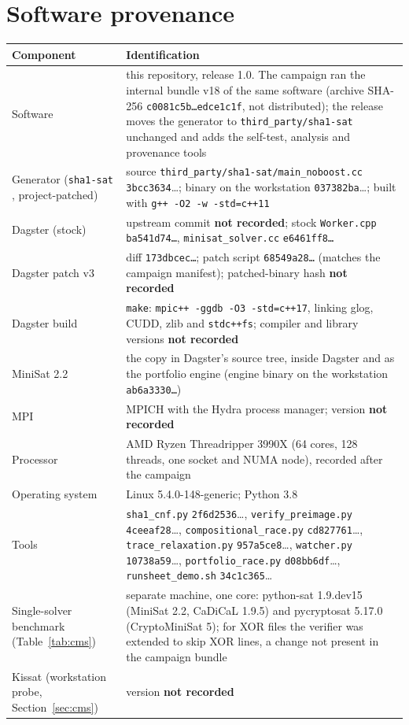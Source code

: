 \documentclass[11pt,a4paper]{article}
\begin{document}
\section{Software provenance}\label{app:prov}
\begin{center}\footnotesize
\begin{tabularx}{\textwidth}{@{}lL@{}}
\toprule
\textbf{Component} & \textbf{Identification}\\
\midrule
Software & this repository, release 1.0. The campaign ran the internal bundle v18 of the same
software (archive SHA-256 \texttt{c0081c5b\dots edce1c1f}, not distributed); the release moves the
generator to \texttt{third\_party/sha1-sat} unchanged and adds the self-test, analysis and provenance
tools\\
Generator (\texttt{sha1-sat} \cite{nossum}, project-patched) & source \texttt{third\_party/sha1-sat/main\_noboost.cc} \texttt{3bcc3634}\dots;
binary on the workstation \texttt{037382ba}\dots; built with \texttt{g++ -O2 -w -std=c++11}\\
Dagster (stock) & upstream commit \textbf{not recorded}; stock \texttt{Worker.cpp} \texttt{ba541d74\dots},
\texttt{minisat\_solver.cc} \texttt{e6461ff8\dots}\\
Dagster patch v3 & diff \texttt{173dbcec\dots}; patch script \texttt{68549a28\dots} (matches the campaign
manifest); patched-binary hash \textbf{not recorded}\\
Dagster build & \texttt{make}: \texttt{mpic++ -ggdb -O3 -std=c++17}, linking glog, CUDD, zlib and
\texttt{stdc++fs}; compiler and library versions \textbf{not recorded}\\
MiniSat 2.2 & the copy in Dagster's source tree, inside Dagster and as the portfolio engine
(engine binary on the workstation \texttt{ab6a3330\dots})\\
MPI & MPICH with the Hydra process manager; version \textbf{not recorded}\\
Processor & AMD Ryzen Threadripper 3990X (64 cores, 128 threads, one socket and NUMA node), recorded after the campaign\\
Operating system & Linux 5.4.0-148-generic; Python 3.8\\
Tools & \texttt{sha1\_cnf.py} \texttt{2f6d2536}\dots, \texttt{verify\_preimage.py} \texttt{4ceeaf28}\dots,
\texttt{compositional\_race.py} \texttt{cd827761}\dots, \texttt{trace\_relaxation.py} \texttt{957a5ce8}\dots, \texttt{watcher.py}
\texttt{10738a59}\dots, \texttt{portfolio\_race.py} \texttt{d08bb6df}\dots, \texttt{runsheet\_demo.sh} \texttt{34c1c365}\dots\\
Single-solver benchmark (Table~\ref{tab:cms}) & separate machine, one core: python-sat 1.9.dev15 (MiniSat 2.2,
CaDiCaL 1.9.5) and pycryptosat 5.17.0 (CryptoMiniSat 5); for XOR files the verifier was extended to
skip XOR lines, a change not present in the campaign bundle\\
Kissat (workstation probe, Section~\ref{sec:cms}) & version \textbf{not recorded}\\
\bottomrule
\end{tabularx}
\end{center}
\end{document}
